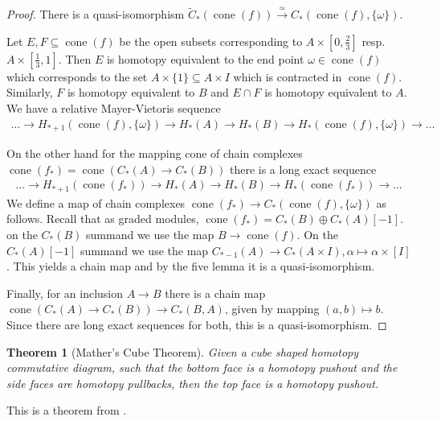 \documentclass{scrartcl}
\theoremstyle{plain}
\newtheorem{theorem}{Theorem}[section]
\theoremstyle{definition}
\newcommand{\cat}[1]{\mathbcal{#1}}
\renewcommand{\subset}{\subseteq}
\newcommand{\isect}{\mathbin{\cap}}
\DeclareMathOperator{\cone}{cone}
\newcommand{\quiso}{\simeq}
\let\xto\xrightarrow
\begin{document}
\begin{proof}
    There is a quasi-isomorphism $\tilde C_*(\cone(f)) \xto{\quiso} C_*(\cone(f), \{\omega\}) $. 

    Let $E, F\subset \cone(f)$ be the open subsets corresponding to $A\times [0, \frac 23]$ resp.\ $A\times [\frac 13, 1]$. Then $E$ is homotopy equivalent to the end point $\omega\in \cone(f)$ which corresponds to the set $A\times\{1\}\subset A\times I$ which is contracted in $\cone(f)$. Similarly, $F$ is homotopy equivalent to $B$ and $E\isect F$ is homotopy equivalent to $A$. We have a relative Mayer-Vietoris sequence
    \begin{align*}
        \dots\to H_{*+1}(\cone(f), \{\omega\}) \to H_*(A)\to H_*(B) \to H_*(\cone(f), \{\omega\})\to\dots
    \end{align*}
    
    On the other hand for the mapping cone of chain complexes $\cone(f_*) = \cone(C_*(A)\to C_*(B))$ there is a long exact sequence 
    \begin{align*}
        \dots\to H_{*+1}(\cone(f_*)) \to H_*(A)\to H_*(B) \to H_*(\cone(f_*))\to\dots
    \end{align*}
    We define a map of chain complexes $\cone(f_*)\to C_*(\cone(f), \{\omega\})$ as follows. Recall that as graded modules, $\cone(f_*) = C_*(B)\oplus C_*(A)[-1]$. on the $C_*(B)$ summand we use the map $B\to \cone(f)$. On the $C_*(A)[-1]$ summand we use the map $C_{*-1}(A)\to C_{*}(A\times I), \alpha\mapsto\alpha\times[I]$. This yields a chain map and by the five lemma it is a quasi-isomorphism. 

    Finally, for an inclusion $A\to B$ there is a chain map $\cone(C_*(A)\to C_*(B))\to C_*(B, A)$, given by mapping $(a, b)\mapsto b$. Since there are long exact sequences for both, this is a quasi-isomorphism. 
\end{proof}

\begin{theorem}[Mather's Cube Theorem]\label{thm:mather-cube}
    Given a cube shaped homotopy commutative diagram, such that the bottom face is a homotopy pushout and the side faces are homotopy pullbacks, then the top face is a homotopy pushout.
\end{theorem}
This is a theorem from \cite{mather1976pull}.


\end{document}
